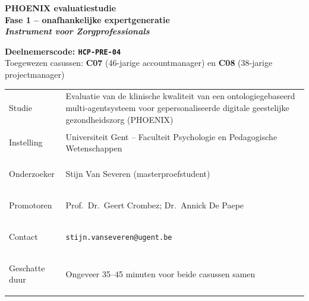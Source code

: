 \documentclass[11pt,a4paper]{article}
\renewcommand{\arraystretch}{1.28}
\begin{document}
\thispagestyle{fancy}
\vspace*{0.3cm}

\begin{tcolorbox}[
  colback=DarkBlue,colframe=DarkBlue,
  arc=3mm,left=14pt,right=14pt,top=12pt,bottom=12pt,
  width=\textwidth
]
\centering
{\fontsize{22}{28}\selectfont\bfseries\color{white}
PHOENIX evaluatiestudie\\[0.3em]
\fontsize{15}{20}\selectfont\color{AccentBlue}
Fase 1 -- onafhankelijke expertgeneratie\\[0.2em]
\fontsize{12}{16}\selectfont\color{white}
\textit{Instrument voor Zorgprofessionals}
}
\end{tcolorbox}

\vspace{0.6cm}

\begin{center}
\begin{tcolorbox}[
  colback=AccentBlue,colframe=PrimaryBlue,
  arc=2.5mm,boxrule=1.2pt,left=12pt,right=12pt,top=10pt,bottom=10pt,
  width=0.86\textwidth
]
\centering
{\large\bfseries\color{DarkBlue}Deelnemerscode: \texttt{HCP-PRE-04}}\\[0.5em]
{\normalsize\color{SlateMid}
Toegewezen casussen:\quad
\textbf{\color{PrimaryBlue}C07} (46-jarige accountmanager)
\quad en \quad
\textbf{\color{PrimaryBlue}C08} (38-jarige projectmanager)
}
\end{tcolorbox}
\end{center}

\vspace{0.5cm}

\begin{center}
\begin{tcolorbox}[
  colback=SoftBG,colframe=BorderGrey,
  arc=2mm,left=10pt,right=10pt,top=9pt,bottom=9pt,
  width=0.92\textwidth
]
\small\renewcommand{\arraystretch}{1.28}
\begin{tabularx}{\textwidth}{@{}>{\bfseries\raggedright\arraybackslash}p{}X@{}}
Studie & Evaluatie van de klinische kwaliteit van een ontologiegebaseerd multi-agentsysteem voor gepersonaliseerde digitale geestelijke gezondheidszorg (PHOENIX) \\
Instelling & Universiteit Gent -- Faculteit Psychologie en Pedagogische Wetenschappen \\
Onderzoeker & Stijn Van Severen (masterproefstudent) \\
Promotoren & Prof.\ Dr.\ Geert Crombez; Dr.\ Annick De Paepe \\
Contact & \texttt{stijn.vanseveren@ugent.be} \\
Geschatte duur & Ongeveer 35--45 minuten voor beide casussen samen \\
\end{tabularx}
\end{tcolorbox}
\end{center}
\end{document}
